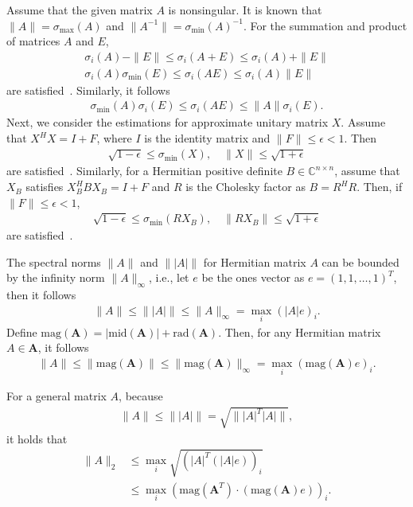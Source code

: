 Assume that the given matrix $A$ is nonsingular.
It is known that $\|A\|=\sigma_{\max}(A)$ and $\|A^{-1}\|=\sigma_{\min}(A)^{-1}$.
For the summation and product of matrices $A$ and $E$,
\begin{align}
    \sigma_i(A)-\|E\|\leq \sigma_i(A+E)\leq \sigma_i(A)+\|E\|\label{eq:sum}\\
    \sigma_i(A)\sigma_{\min}(E)\leq \sigma_i(AE)\leq \sigma_i(A)\|E\|\label{eq:prod}
\end{align}
are satisfied~\cite[Theorem 3.3.16]{horn1994topics}.
Similarly, it follows 
\begin{align}
    \sigma_{\min}(A)\sigma_{i}(E)\leq \sigma_i(AE)\leq \|A\|\sigma_{i}(E).\label{eq:prod2}
\end{align}
Next, we consider the estimations for approximate unitary matrix $X$.
Assume that $X^HX=I+F$, where $I$ is the identity matrix and $\|F\|\leq \epsilon<1$.
Then
\begin{align}
    \sqrt{1-\epsilon}\leq \sigma_{\min}(X),\quad \|X\|\leq \sqrt{1+\epsilon}
\end{align}
are satisfied~\cite{rump2011verified}.
Similarly, for a Hermitian positive definite $B\in\mathbb{C}^{n\times n}$, assume that $X_B$ satisfies $X_B^HBX_B=I+F$ and $R$ is the Cholesky factor as $B=R^HR$.
Then, if $\|F\|\leq \epsilon<1$,
\begin{align}
    \sqrt{1-\epsilon}\leq \sigma_{\min}(RX_B),\quad \|RX_B\|\leq \sqrt{1+\epsilon}\label{eq:borth}
\end{align}
are satisfied~\cite{miyajima2010fast}.

The spectral norms $\|A\|$ and $\||A|\|$ for Hermitian matrix $A$ can be bounded by the infinity norm $\|A\|_{\infty}$, i.e., 
let $e$ be the ones vector as $e=(1,1,\dots,1)^T$, then it follows
\begin{align}
    \|A\|\leq \||A|\|\leq \|A\|_{\infty}=\max_i(|A|e)_i.
\end{align}
Define $\mathrm{mag}(\bm A)=|\mathrm{mid}(\bm A)|+\mathrm{rad}(\bm A)$.
Then, for any Hermitian matrix $A\in\bm A$, it follows
\begin{align}
    \|A\|\leq \|\mathrm{mag}(\bm A)\|\leq \|\mathrm{mag}(\bm A)\|_{\infty}=\max_i(\mathrm{mag}(\bm A)e)_i.
\end{align}

For a general matrix $A$, because
\begin{align}
    \|A\|\leq \||A|\|=\sqrt{\||A|^T|A|\|},
\end{align}
it holds that
\begin{align}
    \|A\|_2&\leq \max_{i}\sqrt{(|A|^T(|A|e))_i}\\
    &\leq\max_i(\mathrm{mag}(\bm A^T)\cdot(\mathrm{mag}(\bm A)e))_i.
\end{align}



